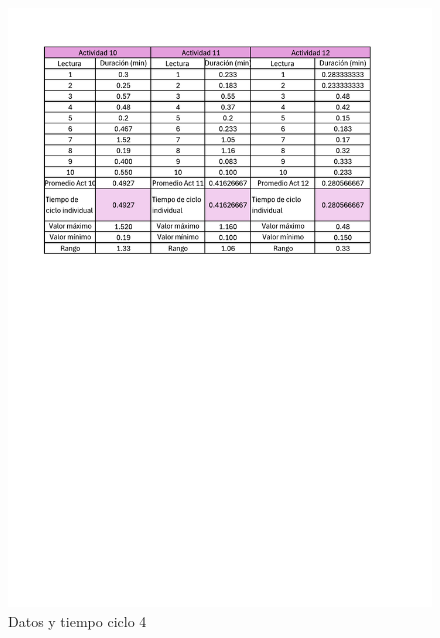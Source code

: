     \begin{figure}[H]
        \centering
        \includegraphics[trim = {15mm 160mm 20mm 
        0mm},clip,scale=0.4]{16/Img/muestreo4}
        \caption{Datos y tiempo ciclo 4}
        \label{fig:Datos y tiempo ciclo 4}
         \end{figure}
    

